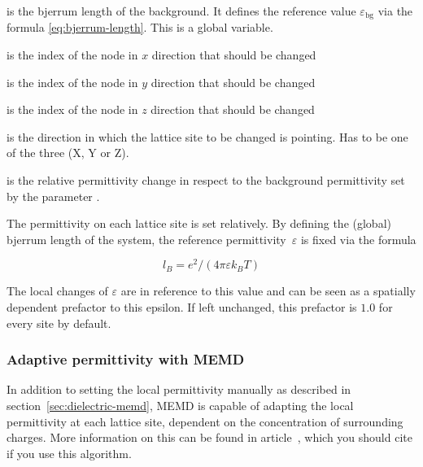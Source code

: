 \begin{arguments}
\item[\var{l_B}] is the bjerrum length of the background. It defines
	the reference value $\varepsilon_\text{bg}$ via the formula 
	\eqref{eq:bjerrum-length}. This is a global variable.
\item[\var{node\_x}] is the index of the node in $x$ direction that
	should be changed
\item[\var{node\_y}] is the index of the node in $y$ direction that
	should be changed
\item[\var{node\_z}] is the index of the node in $z$ direction that
	should be changed
\item[\var{X/Y/Z}] is the direction in which the lattice site to be
	changed is pointing. Has to be one of the three (X, Y or Z).
\item[\var{\varepsilon}] is the relative permittivity change in
	respect to the background permittivity set by the parameter
	.
\end{arguments}

The permittivity on each lattice site is set relatively. By defining
the (global) bjerrum length of the system, the reference
permittivity~$\varepsilon$ is fixed via the formula

\begin{equation}
l_B = e^2 / (4 \pi \varepsilon k_B T)
\label{eq:bjerrum-length}
\end{equation}

The local changes of $\varepsilon$ are in reference to this value
and can be seen as a spatially dependent prefactor to this epsilon.
If left unchanged, this prefactor is $1.0$ for every site by
default.

\subsubsection{Adaptive permittivity with MEMD}
\label{sec:adaptive-memd}

In addition to setting the local permittivity manually as described in section~\ref{sec:dielectric-memd}, MEMD is capable of adapting the local permittivity at each lattice site, dependent on the concentration of surrounding charges. More information on this can be found in article~\cite{fahrenberger15b}, which you should cite if you use this algorithm.

